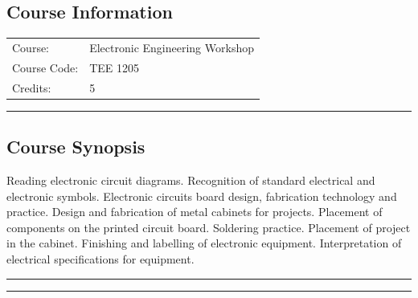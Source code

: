 
\subsection*{Course Information}
\vspace{0ex}%
\noindent\parbox{0.5\textwidth}{%
    \noindent\begin{tabular}{@{}ll}
                 \textsf{Course:}          & 	Electronic Engineering Workshop \\
                 \textsf{Course Code:}         & 	TEE 1205 \\
                 \textsf{Credits:}    & 	5
    \end{tabular}}
\vspace{2ex}\hrule\vspace{2ex}


\subsection*{Course Synopsis}
Reading electronic circuit diagrams.
Recognition of standard electrical and electronic symbols.
Electronic circuits board design, fabrication technology and practice.
Design and fabrication of metal cabinets for projects.
Placement of components on the printed circuit board. Soldering practice.
Placement of project in the cabinet.
Finishing and labelling of electronic equipment.
Interpretation of electrical specifications for equipment.
\vspace{2ex}\hrule
\vspace{2ex}\hrule\vspace{2ex}